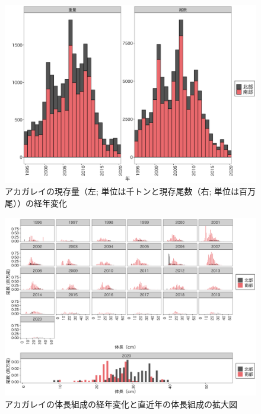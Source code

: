\documentclass[11pt]{article} %
\begin{document}
\begin{linenumbers}
\begin{figure}[h]
  \centering
  \includegraphics[width = 14cm]{アカガレイtrend.png}
  \caption{アカガレイの現存量（左; 単位は千トンと現存尾数（右; 単位は百万尾））の経年変化}
\end{figure}

\begin{figure}[h]
  \centering
  \includegraphics[width = 14cm]{アカガレイlength.png}
  \caption{アカガレイの体長組成の経年変化と直近年の体長組成の拡大図}
\end{figure}


\end{linenumbers}
\end{document}
